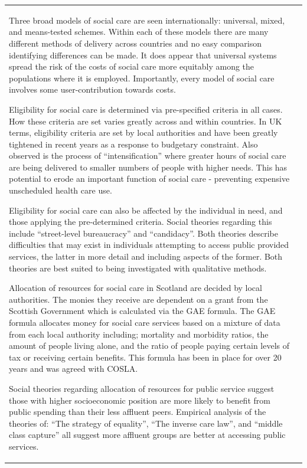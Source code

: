 \documentclass[12pt,a4paper,oneside,table]{report}
\begin{document}
\begin{tabular}[t]{ll}
Three broad models of social care are seen internationally: universal,
mixed, and means-tested schemes. Within each of these models there are
many different methods of delivery across countries and no easy
comparison identifying differences can be made. It does appear that
universal systems spread the risk of the costs of social care more
equitably among the populations where it is employed. Importantly, every
model of social care involves some user-contribution towards costs.

Eligibility for social care is determined via pre-specified criteria in
all cases. How these criteria are set varies greatly across and within
countries. In UK terms, eligibility criteria are set by local
authorities and have been greatly tightened in recent years as a
response to budgetary constraint. Also observed is the process of
``intensification'' where greater hours of social care are being
delivered to smaller numbers of people with higher needs. This has
potential to erode an important function of social care - preventing
expensive unscheduled health care use.

Eligibility for social care can also be affected by the individual in
need, and those applying the pre-determined criteria. Social theories
regarding this include ``street-level bureaucracy'' and ``candidacy''.
Both theories describe difficulties that may exist in individuals
attempting to access public provided services, the latter in more detail
and including aspects of the former. Both theories are best suited to
being investigated with qualitative methods.

Allocation of resources for social care in Scotland are decided by local
authorities. The monies they receive are dependent on a grant from the
Scottish Government which is calculated via the GAE formula. The GAE
formula allocates money for social care services based on a mixture of
data from each local authority including; mortality and morbidity
ratios, the amount of people living alone, and the ratio of people
paying certain levels of tax or receiving certain benefits. This formula
has been in place for over 20 years and was agreed with COSLA.

Social theories regarding allocation of resources for public service
suggest those with higher socioeconomic position are more likely to
benefit from public spending than their less affluent peers. Empirical
analysis of the theories of: ``The strategy of equality'', ``The inverse
care law'', and ``middle class capture'' all suggest more affluent
groups are better at accessing public services.


\end{tabular}
\end{document}
